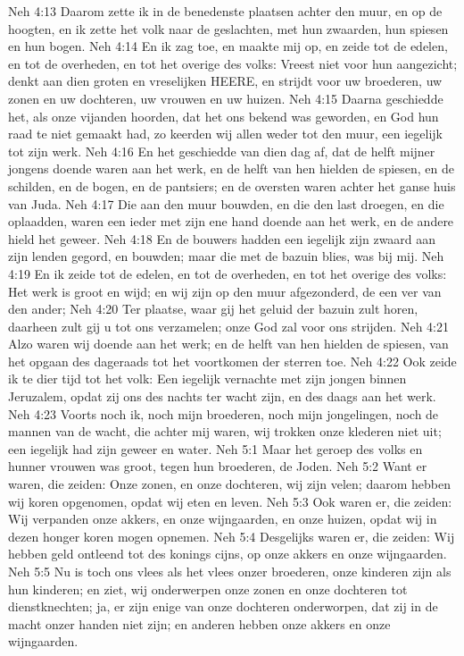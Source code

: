 Neh 4:13  Daarom zette ik in de benedenste plaatsen achter den muur, en op de hoogten, en ik zette het volk naar de geslachten, met hun zwaarden, hun spiesen en hun bogen.
Neh 4:14  En ik zag toe, en maakte mij op, en zeide tot de edelen, en tot de overheden, en tot het overige des volks: Vreest niet voor hun aangezicht; denkt aan dien groten en vreselijken HEERE, en strijdt voor uw broederen, uw zonen en uw dochteren, uw vrouwen en uw huizen.
Neh 4:15  Daarna geschiedde het, als onze vijanden hoorden, dat het ons bekend was geworden, en God hun raad te niet gemaakt had, zo keerden wij allen weder tot den muur, een iegelijk tot zijn werk.
Neh 4:16  En het geschiedde van dien dag af, dat de helft mijner jongens doende waren aan het werk, en de helft van hen hielden de spiesen, en de schilden, en de bogen, en de pantsiers; en de oversten waren achter het ganse huis van Juda.
Neh 4:17  Die aan den muur bouwden, en die den last droegen, en die oplaadden, waren een ieder met zijn ene hand doende aan het werk, en de andere hield het geweer.
Neh 4:18  En de bouwers hadden een iegelijk zijn zwaard aan zijn lenden gegord, en bouwden; maar die met de bazuin blies, was bij mij.
Neh 4:19  En ik zeide tot de edelen, en tot de overheden, en tot het overige des volks: Het werk is groot en wijd; en wij zijn op den muur afgezonderd, de een ver van den ander;
Neh 4:20  Ter plaatse, waar gij het geluid der bazuin zult horen, daarheen zult gij u tot ons verzamelen; onze God zal voor ons strijden.
Neh 4:21  Alzo waren wij doende aan het werk; en de helft van hen hielden de spiesen, van het opgaan des dageraads tot het voortkomen der sterren toe.
Neh 4:22  Ook zeide ik te dier tijd tot het volk: Een iegelijk vernachte met zijn jongen binnen Jeruzalem, opdat zij ons des nachts ter wacht zijn, en des daags aan het werk.
Neh 4:23  Voorts noch ik, noch mijn broederen, noch mijn jongelingen, noch de mannen van de wacht, die achter mij waren, wij trokken onze klederen niet uit; een iegelijk had zijn geweer en water.
Neh 5:1  Maar het geroep des volks en hunner vrouwen was groot, tegen hun broederen, de Joden.
Neh 5:2  Want er waren, die zeiden: Onze zonen, en onze dochteren, wij zijn velen; daarom hebben wij koren opgenomen, opdat wij eten en leven.
Neh 5:3  Ook waren er, die zeiden: Wij verpanden onze akkers, en onze wijngaarden, en onze huizen, opdat wij in dezen honger koren mogen opnemen.
Neh 5:4  Desgelijks waren er, die zeiden: Wij hebben geld ontleend tot des konings cijns, op onze akkers en onze wijngaarden.
Neh 5:5  Nu is toch ons vlees als het vlees onzer broederen, onze kinderen zijn als hun kinderen; en ziet, wij onderwerpen onze zonen en onze dochteren tot dienstknechten; ja, er zijn enige van onze dochteren onderworpen, dat zij in de macht onzer handen niet zijn; en anderen hebben onze akkers en onze wijngaarden.

